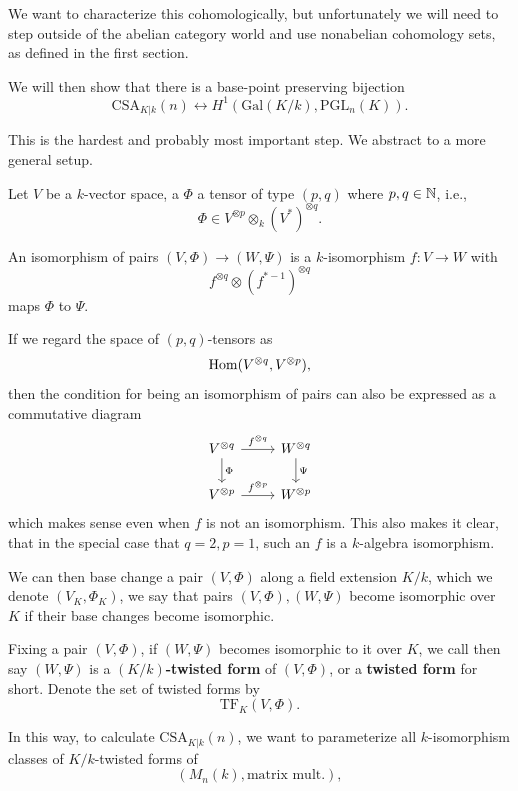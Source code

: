 \documentclass[12pt]{article}
\newcommand{\Gal}{\mathrm{Gal}}
\newcommand{\PGL}{\mathrm{PGL}}
\begin{document}
We want to characterize this cohomologically, but unfortunately we will need to step outside of the abelian category world and use nonabelian cohomology sets, as defined in the first section.

We will then show that there is a base-point preserving bijection
\[\mathrm{CSA}_{K|k}(n) \leftrightarrow H^1(\Gal(K/k),\PGL_n(K)).\]

This is the hardest and probably most important step. We abstract to a more general setup.

\begin{defn}
    Let $V$ be a $k$-vector space, a $\Phi$ a tensor of type $(p,q)$ where $p,q\in \mathbb{N}$, i.e.,
    \[\Phi \in V^{\otimes p} \otimes_k (V^*)^{\otimes q}.\]

    An isomorphism of pairs $(V,\Phi)\to (W,\Psi)$ is a $k$-isomorphism $f:V\to W$ with
    \[f^{\otimes q} \otimes (f^{*-1})^{\otimes q}\]
    maps $\Phi$ to $\Psi$.
\end{defn}

\begin{rmk}
    If we regard the space of $(p,q)$-tensors as
    \[\mathrm{Hom}(V^{\otimes q}, V^{\otimes p}),\]
    then the condition for being an isomorphism of pairs can also be expressed as a commutative diagram
    \[\begin{tikzcd}
        V^{\otimes q} \rar["f^{\otimes q}"] \dar["\Phi"] & W^{\otimes q} \dar["\Psi"]\\
        V^{\otimes p} \rar["f^{\otimes p}"] & W^{\otimes p}
    \end{tikzcd}\]
    which makes sense even when $f$ is not an isomorphism. This also makes it clear, that in the special case that $q=2,p=1$, such an $f$ is a $k$-algebra isomorphism.
\end{rmk}

We can then base change a pair $(V,\Phi)$ along a field extension $K/k$, which we denote $(V_K, \Phi_K)$, we say that pairs $(V,\Phi),(W,\Psi)$ become isomorphic over $K$ if their base changes become isomorphic.

\begin{defn}
    Fixing a pair $(V,\Phi)$, if $(W,\Psi)$ becomes isomorphic to it over $K$, we call then say $(W,\Psi)$ is a \textbf{$(K/k)$-twisted form} of $(V,\Phi)$, or a \textbf{twisted form} for short. Denote the set of twisted forms by
    \[\mathrm{TF}_K(V,\Phi).\]
\end{defn}

In this way, to calculate $\mathrm{CSA}_{K|k}(n)$, we want to parameterize all $k$-isomorphism classes of $K/k$-twisted forms of
\[(M_n(k),\text{matrix mult.}),\]
\end{document}
